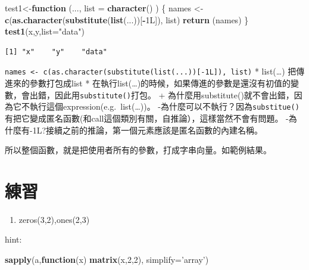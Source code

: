 \documentclass[]{book}
\newenvironment{Shaded}{\begin{snugshade}}{\end{snugshade}}
\newcommand{\ControlFlowTok}[1]{\textcolor[rgb]{0.13,0.29,0.53}{\textbf{#1}}}
\newcommand{\DataTypeTok}[1]{\textcolor[rgb]{0.13,0.29,0.53}{#1}}
\newcommand{\DecValTok}[1]{\textcolor[rgb]{0.00,0.00,0.81}{#1}}
\newcommand{\KeywordTok}[1]{\textcolor[rgb]{0.13,0.29,0.53}{\textbf{#1}}}
\newcommand{\NormalTok}[1]{#1}
\newcommand{\OperatorTok}[1]{\textcolor[rgb]{0.81,0.36,0.00}{\textbf{#1}}}
\newcommand{\StringTok}[1]{\textcolor[rgb]{0.31,0.60,0.02}{#1}}
\providecommand{\tightlist}{%
  \setlength{\itemsep}{0pt}\setlength{\parskip}{0pt}}
\theoremstyle{definition}
\theoremstyle{definition}
\theoremstyle{definition}
\theoremstyle{remark}
\begin{document}
\begin{Shaded}
\begin{Highlighting}[]
\NormalTok{test1<-}\ControlFlowTok{function}\NormalTok{ (..., }\DataTypeTok{list =} \KeywordTok{character}\NormalTok{() ) }
\NormalTok{\{}
\NormalTok{    names <-}\StringTok{ }\KeywordTok{c}\NormalTok{(}\KeywordTok{as.character}\NormalTok{(}\KeywordTok{substitute}\NormalTok{(}\KeywordTok{list}\NormalTok{(...))[}\OperatorTok{-}\NormalTok{1L]), list)}
    \KeywordTok{return}\NormalTok{ (names)}
\NormalTok{\}}
\KeywordTok{test1}\NormalTok{(x,y,}\DataTypeTok{list=}\StringTok{"data"}\NormalTok{)}
\end{Highlighting}
\end{Shaded}

\begin{verbatim}
[1] "x"    "y"    "data"
\end{verbatim}

\texttt{names\ \textless{}-\ c(as.character(substitute(list(...)){[}-1L{]}),\ list)}
* list(\ldots{}) 把傳進來的參數打包成list *
在執行list(\ldots{})的時候，如果傳進的參數是還沒有初值的變數，會出錯，因此用\texttt{substitute()}打包。
+
為什麼用substitute()就不會出錯，因為它不執行這個expression(e.g.~list(\ldots{}))。
-為什麼可以不執行？因為\texttt{substitue()}有把它變成匿名函數(和call這個類別有關，自推論），這樣當然不會有問題。
-為什麼有-1L?接續之前的推論，第一個元素應該是匿名函數的內建名稱。

所以整個函數，就是把使用者所有的參數，打成字串向量。如範例結果。

\section{練習}

\begin{enumerate}
\def\labelenumi{\arabic{enumi}.}
\tightlist
\item
  zeros(3,2),ones(2,3)
\end{enumerate}

hint:

\begin{Shaded}
\begin{Highlighting}[]
\KeywordTok{sapply}\NormalTok{(a,}\ControlFlowTok{function}\NormalTok{(x) }\KeywordTok{matrix}\NormalTok{(x,}\DecValTok{2}\NormalTok{,}\DecValTok{2}\NormalTok{), }\DataTypeTok{simplify=}\StringTok{'array'}\NormalTok{)}
\end{Highlighting}
\end{Shaded}
\end{document}
